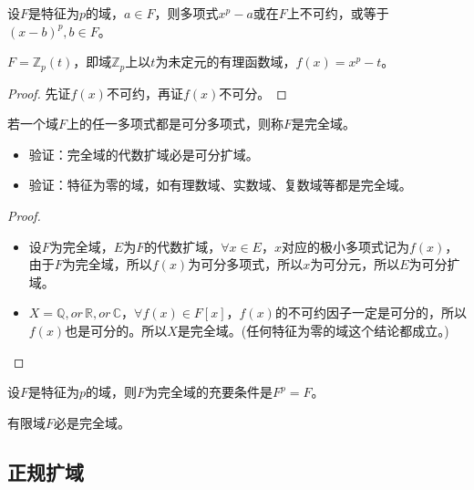 \begin{lemma}
	设$F$是特征为$p$的域，$a\in F$，则多项式$x^{p}-a$或在$F$上不可约，或等于$(x-b)^{p},b\in F$。
\end{lemma}

\begin{example}
	$F=\mathbb{Z}_{p}(t)$，即域$\mathbb{Z}_{p}$上以$t$为未定元的有理函数域，$f(x)=x^{p}-t$。
\end{example}

\begin{proof}
	先证$f(x)$不可约，再证$f(x)$不可分。
\end{proof}

\begin{definition}
	若一个域$F$上的任一多项式都是可分多项式，则称$F$是完全域。
\end{definition}

\begin{proposition}
	\begin{itemize}
		\item 验证：完全域的代数扩域必是可分扩域。
		\item 验证：特征为零的域，如有理数域、实数域、复数域等都是完全域。
	\end{itemize}
\end{proposition}

\begin{proof}
	\begin{itemize}
		\item 设$F$为完全域，$E$为$F$的代数扩域，$\forall x\in E$，$x$对应的极小多项式记为$f(x)$，由于$F$为完全域，所以$f(x)$为可分多项式，所以$x$为可分元，所以$E$为可分扩域。
		
		\item $X=\mathbb{Q},or\, \mathbb{R},or\, \mathbb{C}$，$\forall f(x)\in F[x]$，$f(x)$的不可约因子一定是可分的，所以$f(x)$也是可分的。所以$X$是完全域。(任何特征为零的域这个结论都成立。)
	\end{itemize}
\end{proof}

\begin{theorem}
	设$F$是特征为$p$的域，则$F$为完全域的充要条件是$F^{p}=F$。
\end{theorem}

\begin{corollary}
	有限域$F$必是完全域。
\end{corollary}



\subsection{正规扩域}


